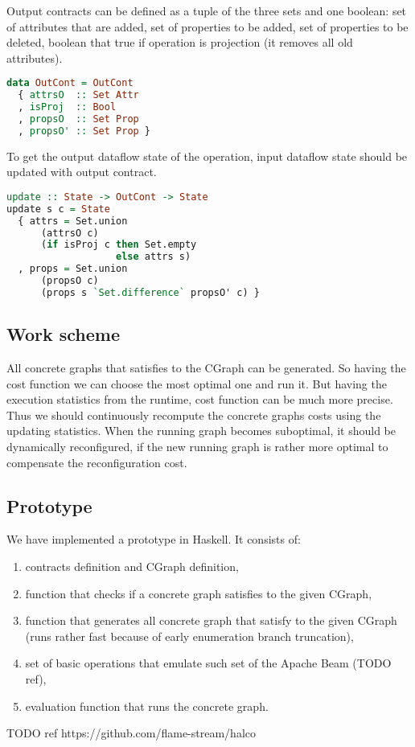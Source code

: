 Output contracts can be defined as a tuple of the three sets and one boolean:
set of attributes that are added,
set of properties to be added,
set of properties to be deleted,
boolean that true if operation is projection (it removes all old attributes).

\begin{lstlisting}[language=Haskell]
data OutCont = OutCont
  { attrsO  :: Set Attr
  , isProj  :: Bool
  , propsO  :: Set Prop
  , propsO' :: Set Prop }
\end{lstlisting}

To get the output dataflow state of the operation, input dataflow state should be updated with output contract.

\begin{lstlisting}[language=Haskell]
update :: State -> OutCont -> State
update s c = State
  { attrs = Set.union
      (attrsO c)
      (if isProj c then Set.empty
                   else attrs s)
  , props = Set.union
      (propsO c)
      (props s `Set.difference` propsO' c) }
\end{lstlisting}

\subsection{Work scheme}

All concrete graphs that satisfies to the CGraph can be generated.
So having the cost function we can choose the most optimal one and run it.
But having the execution statistics from the runtime, cost function can be much more precise.
Thus we should continuously recompute the concrete graphs costs using the updating statistics.
When the running graph becomes suboptimal, it should be dynamically reconfigured, if the new running graph is rather more optimal to compensate the reconfiguration cost.

\subsection{Prototype}

We have implemented a prototype in Haskell.
It consists of:
\begin{enumerate}
    \item contracts definition and CGraph definition,
    \item function that checks if a concrete graph satisfies to the given CGraph,
    \item function that generates all concrete graph that satisfy to the given CGraph (runs rather fast because of early enumeration branch truncation),
    \item set of basic operations that emulate such set of the Apache Beam (TODO ref),
    \item evaluation function that runs the concrete graph.
\end{enumerate}

TODO ref https://github.com/flame-stream/halco
